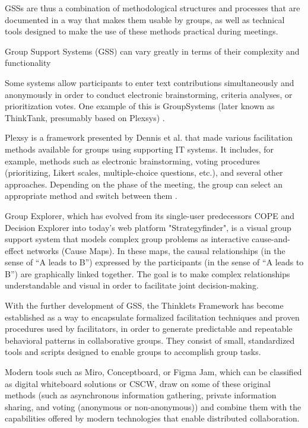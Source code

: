 GSSs are thus a combination of methodological structures and processes that are documented in a way that
makes them usable by groups,
as well as technical tools designed to make the use of these methods practical during
meetings.

Group Support Systems (GSS) can vary greatly in terms of their complexity and functionality

Some systems allow participants to enter text contributions simultaneously and anonymously in order to
conduct electronic
brainstorming, criteria analyses, or prioritization votes. One example of this is
GroupSystems (later known as ThinkTank, presumably based on Plexsys)
\cite[p.634]{ackermannGroupSupportSystems2021}.

Plexsy is a framework presented by Dennis et al. that made various facilitation methods available for groups using
supporting IT systems. It includes, for example, methods such as electronic brainstorming, voting
procedures (prioritizing, Likert scales, multiple-choice questions, etc.), and several other approaches. \cite[p.
606f.] {dennisInformationTechnologySupport1988}
Depending on the phase of the meeting, the group can select an appropriate method and switch between them
. \cite[p. 607]{dennisInformationTechnologySupport1988}

Group Explorer, which has evolved from its single-user predecessors COPE and Decision Explorer into today’s web platform
"Strategyfinder"\cite{InteractiveDecisionMakingPartner}, is a visual group support system that models complex
group problems as interactive cause-and-effect networks (Cause Maps). In these maps, the causal relationships
(in the sense of “A leads to B”) expressed by the participants (in the sense of “A leads to B”) are
graphically linked together. The goal is to make complex relationships understandable and visual in order to
facilitate joint decision-making. \cite[p. 636f]{ackermannGroupSupportSystems2021}

With the further development of GSS, the Thinklets Framework has become established as a way to encapsulate formalized
facilitation techniques and proven procedures used by facilitators, in order to generate predictable and
repeatable behavioral patterns in collaborative groups. They consist of small, standardized tools
and scripts designed to enable groups to accomplish group tasks. \cite[p.
635]{ackermannGroupSupportSystems2021}

Modern tools such as Miro, Conceptboard, or Figma Jam, which can be classified as digital whiteboard solutions or CSCW,
draw on some of these original methods
(such as asynchronous information gathering, private information sharing, and voting (anonymous or
non-anonymous)) and combine them with the capabilities
offered by modern technologies that enable distributed collaboration.

